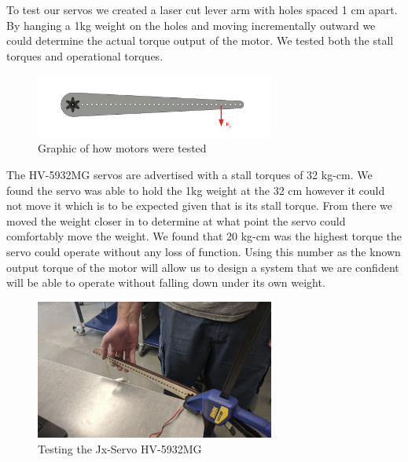                To test our servos we created a laser cut lever arm with holes spaced 1 cm apart. By hanging a 1kg weight on the holes and moving incrementally outward we could determine the actual torque output of the motor. We tested both the stall torques and operational torques.

                \begin{figure}[H]
                    \centering
                    \includegraphics[width=0.7\textwidth]{figures/MotorTestingDiagram.png}
                    \caption{Graphic of how motors were tested}
                    \label{fig:MotorTestingGraphic}
                \end{figure}

                The HV-5932MG servos are advertised with a stall torques of 32 kg-cm. We found the servo was able to hold the 1kg weight at the 32 cm however it could not move it which is to be expected given that is its stall torque. From there we moved the weight closer in to determine at what point the servo could comfortably move the weight. We found that 20 kg-cm was the highest torque the servo could operate without any loss of function. Using this number as the known output torque of the motor will allow us to design a system that we are confident will be able to operate without falling down under its own weight.


                \begin{figure}[H]
                    \centering
                    \includegraphics[width=0.7\textwidth]{figures/TestingMotors.png}
                    \caption{Testing the Jx-Servo HV-5932MG}
                    \label{fig:MotorTesting}
                \end{figure}        
    
